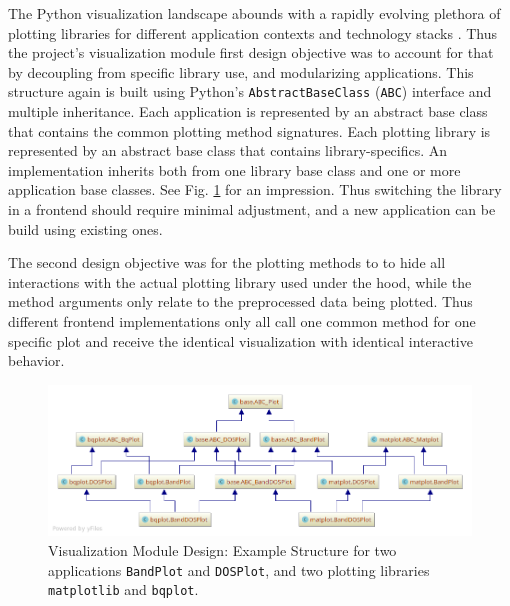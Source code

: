 The Python visualization landscape abounds with a rapidly evolving plethora of
plotting libraries for different application contexts and technology stacks
\cite{python-viz-landscape}. Thus the project's visualization module first
design objective was to account for that by decoupling from specific library
use, and modularizing applications. This structure again is built using Python's
\texttt{AbstractBaseClass} (\texttt{ABC}) interface and multiple inheritance.
Each application is represented by an abstract base class that contains the
common plotting method signatures. Each plotting library is represented by an
abstract base class that contains library-specifics. An implementation inherits
both from one library base class and one or more application base classes. See
Fig. \ref{fig:visualization-module} for an impression. Thus switching the
library in a frontend should require minimal adjustment, and a new application
can be build using existing ones.

The second design objective was for the plotting methods to to hide all
interactions with the actual plotting library used under the hood, while the
method arguments only relate to the preprocessed data being plotted. Thus
different frontend implementations only all call one common method for one
specific plot and receive the identical visualization with identical interactive
behavior.

\begin{figure}[htb!]
    \centering
    \includegraphics[width=1.0\linewidth]{img/pycharm_uml/matplot.png}
    \caption[Visualization Module Design]{Visualization Module Design: Example
      Structure for two applications \texttt{BandPlot} and \texttt{DOSPlot}, and
      two plotting libraries \texttt{matplotlib} and \texttt{bqplot}.}
    \label{fig:visualization-module}
\end{figure}

